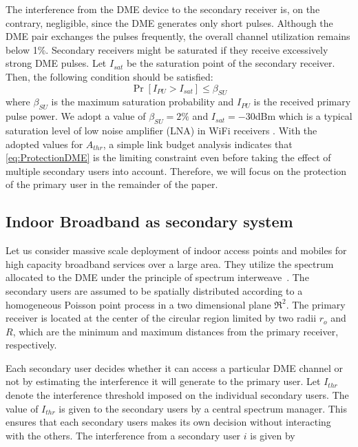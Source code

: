 \documentclass[12pt,submission,journal,onecolumn]{IEEEtran}
\begin{document}
The interference from the DME device to the secondary receiver is, on the contrary, negligible, since the DME generates only short pulses. Although the DME pair exchanges the pulses frequently, the overall channel utilization remains below 1\%. Secondary receivers might be saturated if they receive excessively strong DME pulses.  Let $I_{sat}$ be the saturation point of the secondary receiver. Then, the following condition should be satisfied:
\begin{equation}
\label{eq:ProtectionSU}
\Pr[I_{PU}>I_{sat}]\leq\beta_{SU}
\end{equation}
where $\beta_{SU}$ is the maximum saturation probability and $I_{PU}$ is the received primary pulse power. We adopt a value of $\beta_{SU} = 2\%$ and $I_{sat} = -30$dBm which is a typical saturation level of low noise amplifier (LNA) in WiFi receivers \cite{wp:ti2003}. With the adopted values for $A_{thr}$, a simple link budget analysis indicates that \eqref{eq:ProtectionDME} is the limiting constraint even before taking the effect of multiple secondary users into account. Therefore, we will focus on the protection of the primary user in the remainder of the paper.

\subsection{Indoor Broadband as secondary system}

Let us consider massive scale deployment of indoor access points and mobiles for high capacity broadband services over a large area. They utilize the spectrum allocated to the DME under the principle of spectrum interweave~\cite{4840529}. The secondary users are assumed to be spatially distributed according to a homogeneous Poisson point process in a two dimensional plane $\Re^2$. The primary receiver is located at the center of the circular region limited by two radii $r_{o}$ and $R$, which are the minimum and maximum distances from the primary receiver, respectively.

Each secondary user decides whether it can access a particular DME channel or not by estimating the interference it will generate to the primary user. Let $I_{thr}$ denote the interference threshold imposed on the individual secondary users. The value of $I_{thr}$ is given to the secondary users by a central spectrum manager. This ensures that each secondary users makes its own decision without interacting with the others. The interference from a secondary user $i$ is given by
\end{document}
